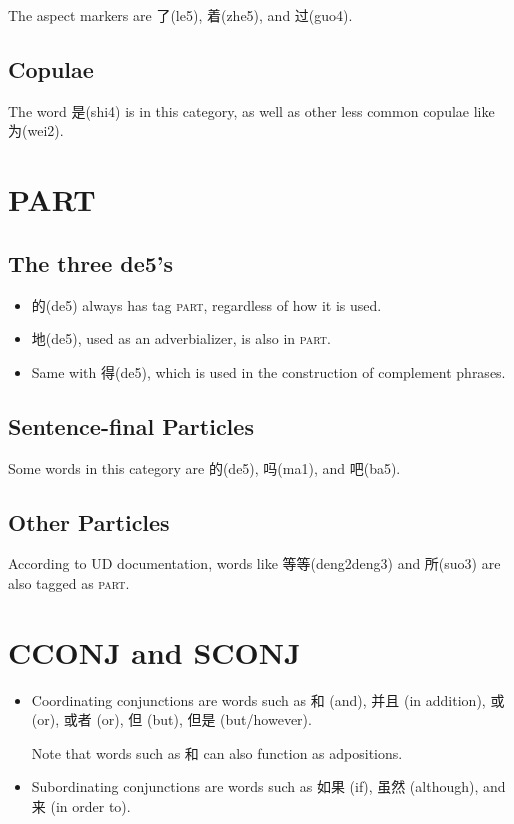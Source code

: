 \documentclass[UTF8,oneside]{book}
\def\particle{\textsc{part}}
\begin{document}
The aspect markers are 了(le5), 着(zhe5), and 过(guo4).

\subsection{Copulae}

The word 是(shi4) is in this category, as well as other less common copulae like 为(wei2). 

\section{PART}

\subsection{The three de5's}

\begin{itemize}
\item {}
的(de5) always has tag \particle, regardless of how it is used. 
\item {}
地(de5), used as an adverbializer, is also in \particle.
\item {}
Same with 得(de5), which is used in the construction of complement phrases. 
\end{itemize}

\subsection{Sentence-final Particles}

Some words in this category are 的(de5), 吗(ma1), and 吧(ba5).

\subsection{Other Particles}

According to UD documentation, words like 等等(deng2deng3) and 所(suo3) are also tagged as \particle.

\section{CCONJ and SCONJ}

\begin{itemize}
\item {}
Coordinating conjunctions are words such as 和 (and), 并且 (in addition), 或 (or), 或者 (or), 但 (but), 但是 (but/however). 

Note that words such as 和 can also function as adpositions.

\item {}
Subordinating conjunctions are words such as 如果 (if), 虽然 (although), and 来 (in order to). 
\end{itemize}
\end{document}
